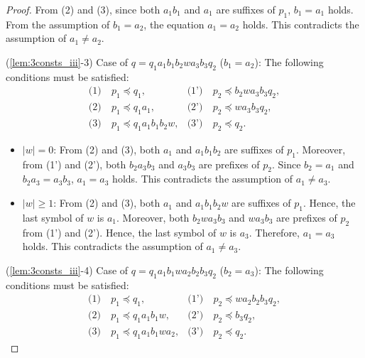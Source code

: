 \begin{proof}
From (2) and (3), since {\color{red}both }$a_{1}b_{1}$ and $a_{1}$ are suffixes of $p_{1}$, 
$b_{1} = a_{1}$ holds.
From the assumption of $b_{1}=a_{2}$, the equation $a_{1}=a_{2}$ holds.
This contradicts the assumption of $a_{1}\not= a_{2}$.
\smallskip

\noindent
(\ref{lem:3consts_iii}-3) Case of $q=q_{1}a_{1}b_{1}b_{2}wa_{3}b_{3}q_{2}$ ($b_{1}=a_{2}$):
The following conditions must be satisfied:
\begin{align*}
\textrm{(1)}~& p_{1} \preceq q_{1}, & \textrm{(1')}~& p_{2} \preceq b_{2}wa_{3}b_{3}q_{2}, \\
\textrm{(2)}~& p_{1} \preceq q_{1}a_{1}, & \textrm{(2')}~& p_{2} \preceq wa_{3}b_{3}q_{2}, \\
\textrm{(3)}~& p_{1} \preceq q_{1}a_{1}b_{1}b_{2}w, & \textrm{(3')}~& p_{2} \preceq q_{2}.
\end{align*}

\begin{itemize}
\item $|w|=0$: From (2) and (3), {\color{red}both }$a_{1}$ and $a_{1}b_{1}b_{2}$ are suffixes of $p_{1}$. Moreover, from (1') and (2'), {\color{red}both }$b_{2}a_{3}b_{3}$ and $a_{3}b_{3}$ are prefixes of $p_{2}$.
Since $b_{2}=a_{1}$ and $b_{2}a_{3}=a_{3}b_{3}$, $a_{1}=a_{3}$ holds.
This contradicts the assumption of $a_{1}\not= a_{3}$.
%
\item $|w| \ge 1$: From (2) and (3), {\color{red}both }$a_{1}$ and $a_{1}b_{1}b_{2}w$ are suffixes of $p_{1}$.
Hence, the last symbol of $w$ is $a_{1}$.
Moreover, {\color{red}both }$b_{2}wa_{3}b_{3}$ and $wa_{3}b_{3}$ are prefixes of $p_{2}$ from (1') and (2').
Hence, the last symbol of $w$ is $a_{3}$.
Therefore, $a_{1}=a_{3}$ holds.
This contradicts the assumption of $a_{1} \ne a_{3}$.
\end{itemize}

\smallskip

\noindent
(\ref{lem:3consts_iii}-4) Case of $q=q_{1}a_{1}b_{1}wa_{2}b_{2}b_{3}q_{2}$ ($b_{2}=a_{3}$):
The following conditions must be satisfied:
\begin{align*}
\textrm{(1)}~& p_{1} \preceq q_{1}, & \textrm{(1')}~& p_{2} \preceq wa_{2}b_{2}b_{3}q_{2}, \\
\textrm{(2)}~& p_{1} \preceq q_{1}a_{1}b_{1}w, & \textrm{(2')}~& p_{2} \preceq b_{3}q_{2}, \\
\textrm{(3)}~& p_{1} \preceq q_{1}a_{1}b_{1}wa_{2}, & \textrm{(3')}~& p_{2} \preceq q_{2}.
\end{align*}
\noindent


\end{proof}
